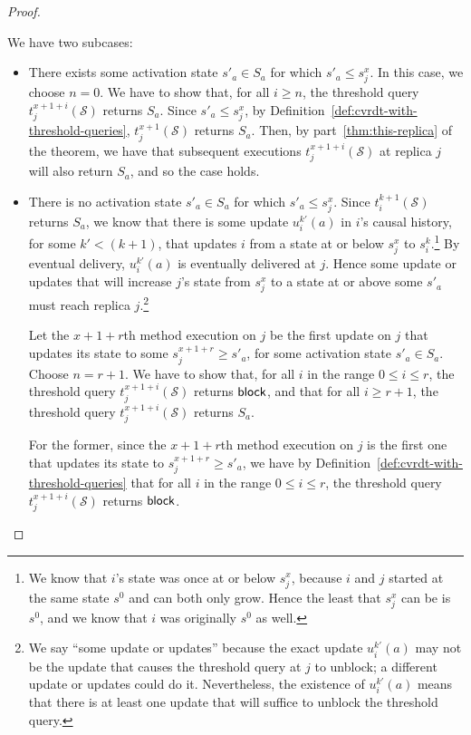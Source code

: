 \begin{proof}
\begin{itemize}
  We have two subcases:

\begin{itemize}
\item
There exists some activation state $s'_a \in S_a$ for which $s'_a \leq
s^x_j$.  In this case, we choose $n = 0$.  We have to show that, for
all $i \geq n$, the threshold query $t^{x+1+i}_j(\mathcal{S})$ returns
$S_a$.  Since $s'_a \leq s^x_j$, by
Definition~\ref{def:cvrdt-with-threshold-queries},
$t^{x+1}_j(\mathcal{S})$ returns $S_a$.  Then, by
part~\ref{thm:this-replica} of the theorem, we have that subsequent
executions $t^{x+1+i}_j(\mathcal{S})$ at replica $j$ will also return
$S_a$, and so the case holds.

\item
There is no activation state $s'_a \in S_a$ for which $s'_a \leq
s^x_j$.  Since $t^{k+1}_i(\mathcal{S})$ returns $S_a$, we know that
there is some update $u^{k'}_i(a)$ in $i$'s causal history, for some
$k' < (k+1)$, that updates $i$ from a state at or below $s^x_j$ to
$s^k_i$.\footnote{We know that $i$'s state was once at or below
$s^x_j$, because $i$ and $j$ started at the same state $s^0$ and can
both only grow.  Hence the least that $s^x_j$ can be is $s^0$, and we
know that $i$ was originally $s^0$ as well.} By eventual delivery,
$u^{k'}_i(a)$ is eventually delivered at $j$.  Hence some update or
updates that will increase $j$'s state from $s^x_j$ to a state at or
above some $s'_a$ must reach replica $j$.\footnote{We say ``some
update or updates'' because the exact update $u^{k'}_i(a)$ may not be
the update that causes the threshold query at $j$ to unblock; a
different update or updates could do it.  Nevertheless, the existence
of $u^{k'}_i(a)$ means that there is at least one update that will
suffice to unblock the threshold query.}

Let the $x+1+r$th method execution on $j$ be the first update on $j$
that updates its state to some $s^{x+1+r}_j \geq s'_a$, for some
activation state $s'_a \in S_a$.  Choose $n = r+1$.  We have to show that, for
all $i$ in the range $0 \leq i \leq r$, the threshold query
$t^{x+1+i}_j(\mathcal{S})$ returns $\textsf{block}$, and that for all $i \geq
r+1$, the threshold query $t^{x+1+i}_j(\mathcal{S})$ returns $S_a$.

For the former, since the $x+1+r$th method execution on $j$ is the
first one that updates its state to $s^{x+1+r}_j \geq s'_a$, we have
by Definition~\ref{def:cvrdt-with-threshold-queries} that for all $i$
in the range $0 \leq i \leq r$, the threshold query
$t^{x+1+i}_j(\mathcal{S})$ returns $\textsf{block}$.


\end{itemize}
\end{itemize}
\end{proof}

